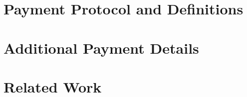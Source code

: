 \documentclass{article}
\begin{document}
	\newpage
    \section{Payment Protocol and Definitions}
    \label{paymentsprotocol}
    
    
    \newpage
    \section{Additional Payment Details}
    \label{paymentsextra}
    
    
    \newpage
    \section{Related Work}
    \label{sec:related}
    
\end{document}
